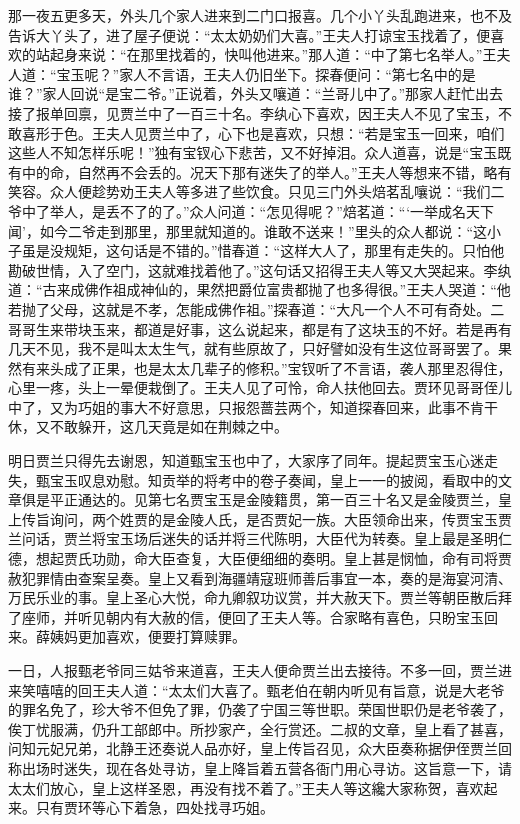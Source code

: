 \begin{parag}
    那一夜五更多天，外头几个家人进来到二门口报喜。几个小丫头乱跑进来，也不及告诉大丫头了，进了屋子便说：“太太奶奶们大喜。”王夫人打谅宝玉找着了，便喜欢的站起身来说：“在那里找着的，快叫他进来。”那人道：“中了第七名举人。”王夫人道：“宝玉呢？”家人不言语，王夫人仍旧坐下。探春便问：“第七名中的是谁？”家人回说“是宝二爷。”正说着，外头又嚷道：“兰哥儿中了。”那家人赶忙出去接了报单回禀，见贾兰中了一百三十名。李纨心下喜欢，因王夫人不见了宝玉，不敢喜形于色。王夫人见贾兰中了，心下也是喜欢，只想：“若是宝玉一回来，咱们这些人不知怎样乐呢！”独有宝钗心下悲苦，又不好掉泪。众人道喜，说是“宝玉既有中的命，自然再不会丢的。况天下那有迷失了的举人。”王夫人等想来不错，略有笑容。众人便趁势劝王夫人等多进了些饮食。只见三门外头焙茗乱嚷说：“我们二爷中了举人，是丢不了的了。”众人问道：“怎见得呢？”焙茗道：“‘一举成名天下闻’，如今二爷走到那里，那里就知道的。谁敢不送来！”里头的众人都说：“这小子虽是没规矩，这句话是不错的。”惜春道：“这样大人了，那里有走失的。只怕他勘破世情，入了空门，这就难找着他了。”这句话又招得王夫人等又大哭起来。李纨道：“古来成佛作祖成神仙的，果然把爵位富贵都抛了也多得很。”王夫人哭道：“他若抛了父母，这就是不孝，怎能成佛作祖。”探春道：“大凡一个人不可有奇处。二哥哥生来带块玉来，都道是好事，这么说起来，都是有了这块玉的不好。若是再有几天不见，我不是叫太太生气，就有些原故了，只好譬如没有生这位哥哥罢了。果然有来头成了正果，也是太太几辈子的修积。”宝钗听了不言语，袭人那里忍得住，心里一疼，头上一晕便栽倒了。王夫人见了可怜，命人扶他回去。贾环见哥哥侄儿中了，又为巧姐的事大不好意思，只报怨蔷芸两个，知道探春回来，此事不肯干休，又不敢躲开，这几天竟是如在荆棘之中。
\end{parag}


\begin{parag}
    明日贾兰只得先去谢恩，知道甄宝玉也中了，大家序了同年。提起贾宝玉心迷走失，甄宝玉叹息劝慰。知贡举的将考中的卷子奏闻，皇上一一的披阅，看取中的文章俱是平正通达的。见第七名贾宝玉是金陵籍贯，第一百三十名又是金陵贾兰，皇上传旨询问，两个姓贾的是金陵人氏，是否贾妃一族。大臣领命出来，传贾宝玉贾兰问话，贾兰将宝玉场后迷失的话并将三代陈明，大臣代为转奏。皇上最是圣明仁德，想起贾氏功勋，命大臣查复，大臣便细细的奏明。皇上甚是悯恤，命有司将贾赦犯罪情由查案呈奏。皇上又看到海疆靖寇班师善后事宜一本，奏的是海宴河清、万民乐业的事。皇上圣心大悦，命九卿叙功议赏，并大赦天下。贾兰等朝臣散后拜了座师，并听见朝内有大赦的信，便回了王夫人等。合家略有喜色，只盼宝玉回来。薛姨妈更加喜欢，便要打算赎罪。
\end{parag}


\begin{parag}
    一日，人报甄老爷同三姑爷来道喜，王夫人便命贾兰出去接待。不多一回，贾兰进来笑嘻嘻的回王夫人道：“太太们大喜了。甄老伯在朝内听见有旨意，说是大老爷的罪名免了，珍大爷不但免了罪，仍袭了宁国三等世职。荣国世职仍是老爷袭了，俟丁忧服满，仍升工部郎中。所抄家产，全行赏还。二叔的文章，皇上看了甚喜，问知元妃兄弟，北静王还奏说人品亦好，皇上传旨召见，众大臣奏称据伊侄贾兰回称出场时迷失，现在各处寻访，皇上降旨着五营各衙门用心寻访。这旨意一下，请太太们放心，皇上这样圣恩，再没有找不着了。”王夫人等这纔大家称贺，喜欢起来。只有贾环等心下着急，四处找寻巧姐。
\end{parag}


